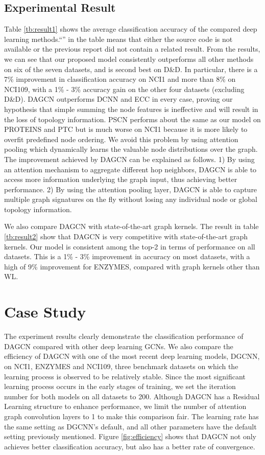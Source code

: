 \documentclass[conference]{IEEEtran}
\begin{document}
	\subsection{Experimental Result} Table \ref{tb:result1} shows the average classification accuracy of the compared deep learning methods.``'' in the table means that either the source code is not available or the previous report did not contain a related result. From the results, we can see that our proposed model consistently outperforms all other methods on six of the seven datasets, and is second best on D\&D. In particular, there is a 7\% improvement in classification accuracy on NCI1 and more than 8\% on NCI109, with a 1\% - 3\% accuracy gain on the other four datasets (excluding D\&D). DAGCN outperforms DCNN and ECC in every case, proving our hypothesis that simple summing the node features is ineffective and will result in the loss of topology information. PSCN performs about the same as our model on PROTEINS and PTC but is much worse on NCI1 because it is more likely to overfit predefined node ordering. We avoid this problem by using attention pooling which dynamically learns the valuable node distributions over the graph. The improvement achieved by DAGCN can be explained as follows. 1) By using an attention mechanism to aggregate different hop neighbors, DAGCN is able to access more information underlying the graph input, thus achieving better performance. 2) By using the attention pooling layer, DAGCN is able to capture multiple graph signatures on the fly without losing any individual node or global topology information. 
	
	We also compare DAGCN with state-of-the-art graph kernels. The result in table \ref{tb:result2} show that DAGCN is very competitive with state-of-the-art graph kernels. Our model is consistent among the top-2 in terms of performance on all datasets. This is a 1\% - 3\% improvement in accuracy on most datasets, with a high of 9\% improvement for ENZYMES, compared with graph kernels other than WL.
    
	\section{Case Study}
	The experiment results clearly demonstrate the classification performance of DAGCN compared with other deep learning GCNs. We also compare the efficiency of DAGCN with one of the most recent deep learning models, DGCNN, on NCI1, ENZYMES and NCI109, three benchmark datasets on which the learning process is observed to be relatively stable. Since the most significant learning process occurs in the early stages of training, we set the iteration number for both models on all datasets to 200. Although DAGCN has a Residual Learning structure to enhance performance, we limit the number of attention graph convolution layers  to 1 to make this comparison fair. The learning rate has the same setting as DGCNN's default, and all other parameters have the default setting previously mentioned. Figure \ref{fig:efficiency} shows that DAGCN not only achieves better classification accuracy, but also has a better rate of convergence.
	
\end{document}
